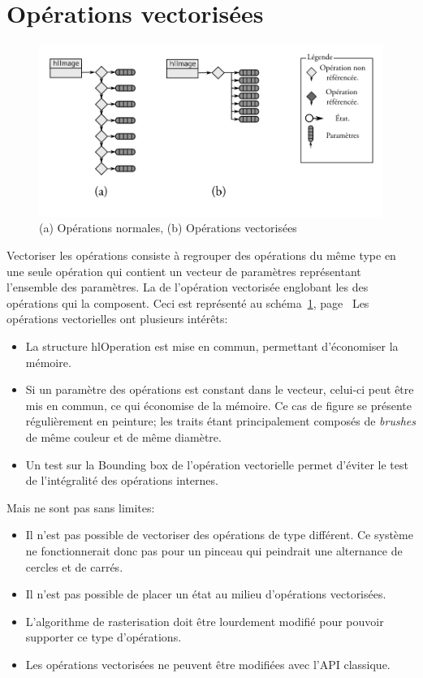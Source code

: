 	\section{Opérations vectorisées}
		\begin{figure}[ht]
			\centering
			\includegraphics[width=\textwidth]{images/vector} 
			\caption{(a) Opérations normales, (b) Opérations vectorisées}
			\label{fig:vector}
		\end{figure}
		Vectoriser les opérations consiste à regrouper des opérations du même type en une seule opération qui contient
		un vecteur de paramètres représentant l'ensemble des paramètres. La \BB de l'opération
		vectorisée englobant les \BB des opérations qui la composent. Ceci est représenté au 
		schéma~\ref{fig:vector}, page~\pageref{fig:vector}
		Les opérations vectorielles ont plusieurs intérêts:
		\begin{itemize}
			\item La structure hlOperation est mise en commun, permettant d'économiser la mémoire.
			\item Si un paramètre des opérations est constant dans le vecteur, celui-ci peut être mis en commun,
			ce qui économise de la mémoire. Ce cas de figure se présente régulièrement en peinture; les traits étant principalement
			composés de \emph{brushes} de même couleur et de même diamètre.
			\item Un test sur la Bounding box de l'opération vectorielle permet d'éviter le test de l'intégralité
			des opérations internes.
		\end{itemize}
		Mais ne sont pas sans limites:
		\begin{itemize}
			\item Il n'est pas possible de vectoriser des opérations de type différent. Ce système ne fonctionnerait
			donc pas pour un pinceau qui peindrait une alternance de cercles et de carrés.
			\item Il n'est pas possible de placer un état au milieu d'opérations vectorisées.
			\item L'algorithme de rasterisation doit être lourdement modifié pour pouvoir supporter ce type d'opérations.
			\item Les opérations vectorisées ne peuvent être modifiées avec l'API classique.
		\end{itemize}
